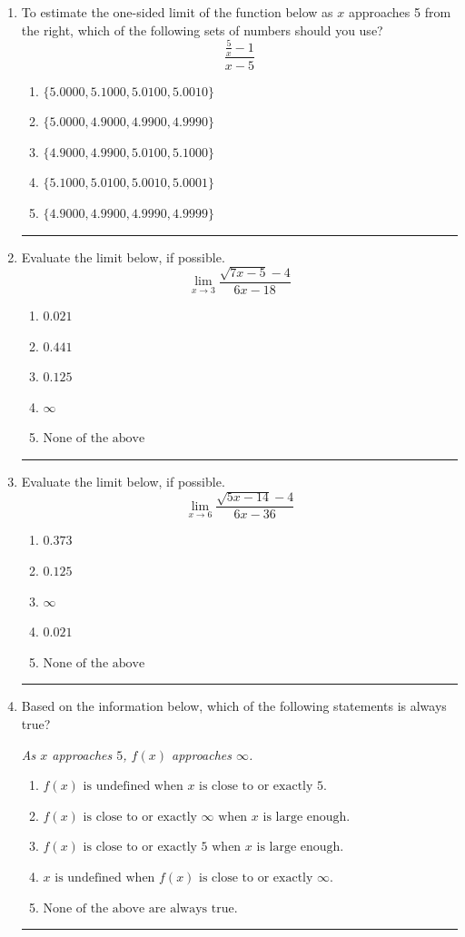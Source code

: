 \documentclass[14pt]{extbook}
\newcommand{\litem}[1]{\item#1\hspace*{-1cm}\rule{\textwidth}{0.4pt}}
\begin{document}
\begin{enumerate}
{\begin{enumerate}[label=\Alph*.]
\end{enumerate} }
\litem{
To estimate the one-sided limit of the function below as $x$ approaches 5 from the right, which of the following sets of numbers should you use?\[ \frac{\frac{5}{x} - 1}{x - 5} \]\begin{enumerate}[label=\Alph*.]
\item \( \{ 5.0000, 5.1000, 5.0100, 5.0010 \} \)
\item \( \{ 5.0000, 4.9000, 4.9900, 4.9990 \} \)
\item \( \{ 4.9000, 4.9900, 5.0100, 5.1000 \} \)
\item \( \{ 5.1000, 5.0100, 5.0010, 5.0001 \} \)
\item \( \{ 4.9000, 4.9900, 4.9990, 4.9999 \} \)

\end{enumerate} }
\litem{
Evaluate the limit below, if possible.\[ \lim_{x \rightarrow 3} \frac{\sqrt{7x - 5} - 4}{6x - 18} \]\begin{enumerate}[label=\Alph*.]
\item \( 0.021 \)
\item \( 0.441 \)
\item \( 0.125 \)
\item \( \infty \)
\item \( \text{None of the above} \)

\end{enumerate} }
\litem{
Evaluate the limit below, if possible.\[ \lim_{x \rightarrow 6} \frac{\sqrt{5x - 14} - 4}{6x - 36} \]\begin{enumerate}[label=\Alph*.]
\item \( 0.373 \)
\item \( 0.125 \)
\item \( \infty \)
\item \( 0.021 \)
\item \( \text{None of the above} \)

\end{enumerate} }
\litem{
Based on the information below, which of the following statements is always true?
\begin{center}
    \textit{ As $x$ approaches $5$, $f(x)$ approaches $\infty$. }
\end{center}
\begin{enumerate}[label=\Alph*.]
\item \( f(x) \text{ is undefined when } x \text{ is close to or exactly } 5. \)
\item \( f(x) \text{ is close to or exactly } \infty \text{ when } x \text{ is large enough}. \)
\item \( f(x) \text{ is close to or exactly } 5 \text{ when } x \text{ is large enough}. \)
\item \( x \text{ is undefined when } f(x) \text{ is close to or exactly } \infty. \)
\item \( \text{None of the above are always true.} \)


\end{enumerate}}
\end{enumerate}
\end{document}
